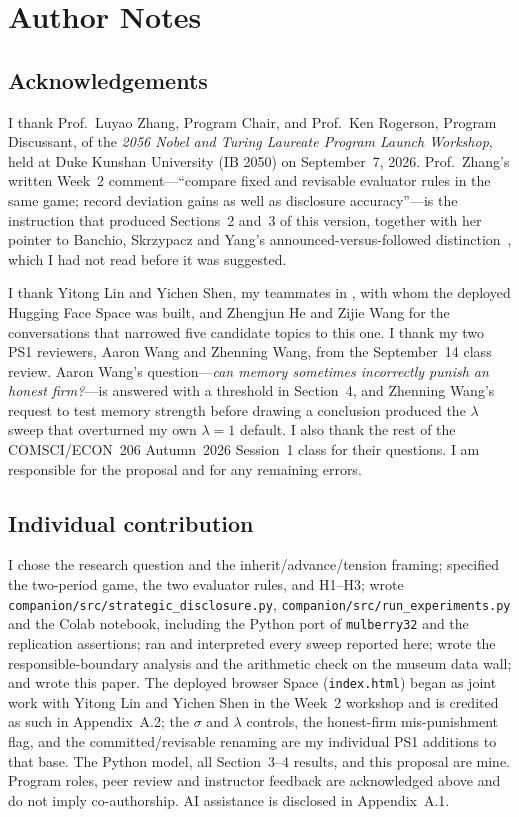 \clearpage
\section*{Author Notes}

\subsection*{Acknowledgements}
I thank Prof.\ Luyao Zhang, Program Chair, and Prof.\ Ken Rogerson, Program
Discussant, of the \emph{2056 Nobel and Turing Laureate Program Launch Workshop},
held at Duke Kunshan University (IB 2050) on September~7, 2026. Prof.\ Zhang's
written Week~2 comment---``compare fixed and revisable evaluator rules in the
same game; record deviation gains as well as disclosure accuracy''---is the
instruction that produced Sections~2 and~3 of this version, together with her
pointer to Banchio, Skrzypacz and Yang's announced-versus-followed
distinction~\cite{banchio2025}, which I had not read before it was suggested.

I thank Yitong Lin and Yichen Shen, my teammates in \WorkshopSession, with whom
the deployed Hugging Face Space was built, and Zhengjun He and Zijie Wang for
the conversations that narrowed five candidate topics to this one. I thank my
two PS1 reviewers, Aaron Wang and Zhenning Wang,
from the September~14 class review. Aaron Wang's question---\emph{can memory
sometimes incorrectly punish an honest firm?}---is answered with a threshold in
Section~4, and Zhenning Wang's request to test memory strength before drawing a
conclusion produced the $\lambda$ sweep that overturned my own $\lambda=1$
default. I also thank the rest of the COMSCI/ECON~206 Autumn~2026 Session~1
class for their questions. I am responsible for the proposal and for any
remaining errors.

\subsection*{Individual contribution}
I chose the research question and the inherit/advance/tension framing; specified
the two-period game, the two evaluator rules, and H1--H3; wrote
\texttt{companion/src/strategic\_disclosure.py}, \texttt{companion/src/run\_experiments.py} and the
Colab notebook, including the Python port of \texttt{mulberry32} and the
replication assertions; ran and interpreted every sweep reported here; wrote the
responsible-boundary analysis and the arithmetic check on the museum data wall;
and wrote this paper. The deployed browser Space (\texttt{index.html}) began as
joint work with Yitong Lin and Yichen Shen in the Week~2 workshop and is credited
as such in Appendix~A.2; the $\sigma$ and $\lambda$ controls, the honest-firm
mis-punishment flag, and the committed/revisable renaming are my individual PS1
additions to that base. The Python model, all Section~3--4 results, and this
proposal are mine. Program roles, peer review and instructor feedback are
acknowledged above and do not imply co-authorship. AI assistance is disclosed in
Appendix~A.1.

